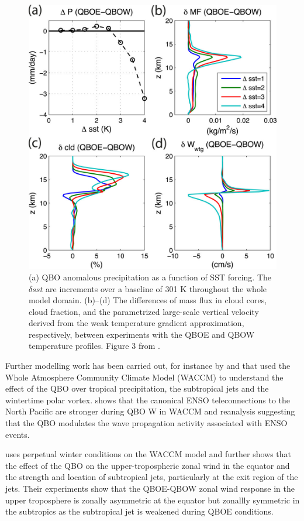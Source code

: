 \begin{figure}[t!]
\centering
\includegraphics[width=0.85\linewidth]{figures/nie_sobel}
\caption{(a) QBO anomalous precipitation as a function of SST forcing. The $\delta sst$ are increments over a baseline of 301 K throughout the whole model domain. (b)–(d) The differences of mass flux in cloud cores, cloud fraction, and the parametrized large-scale vertical velocity derived from the weak temperature gradient approximation, respectively, between experiments with the QBOE and QBOW temperature profiles. Figure 3 from \cite{nie2015}. }
\label{fig:nie}
\end{figure}  

Further modelling work has been carried out, for instance by \cite{garfinkel2010} and \cite{garfinkel2011} that used the Whole Atmosphere Community Climate Model (WACCM) to understand the effect of the QBO over tropical precipitation, the subtropical jets and the wintertime polar vortex. \cite{garfinkel2010} shows that the canonical ENSO teleconnections to the North Pacific are stronger during QBO W in WACCM and reanalysis suggesting that the QBO modulates the wave propagation activity associated with ENSO events.

 \cite{garfinkel2011} uses perpetual winter conditions on the WACCM model and further shows that the effect of the QBO on the upper-tropospheric zonal wind in the equator and the strength and location of subtropical jets, particularly at the exit region of the jets. Their experiments show that the QBOE-QBOW zonal wind response in the upper troposphere is zonally asymmetric at the equator but zonallly symmetric in the subtropics as the subtropical jet is weakened during QBOE conditions.

